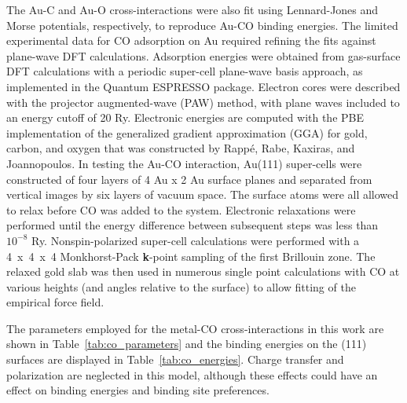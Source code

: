 The Au-C and Au-O cross-interactions were also fit using Lennard-Jones and
Morse potentials, respectively, to reproduce Au-CO binding energies.
The limited experimental data for CO adsorption on Au required refining the fits against plane-wave DFT calculations.
Adsorption energies were obtained from gas-surface DFT calculations with a
periodic super-cell plane-wave basis approach, as implemented in the
Quantum ESPRESSO package.\citep{Giannozzi:2009fe} Electron cores were
described with the projector augmented-wave (PAW)
method,\citep{Blochl:1994vf, Kresse:1999by} with plane waves
included to an energy cutoff of 20 Ry. Electronic energies are
computed with the PBE implementation of the generalized gradient
approximation (GGA) for gold, carbon, and oxygen that was constructed
by Rapp\'e, Rabe, Kaxiras, and Joannopoulos.\citep{Perdew:1996fq, Rappe:1990tw}
In testing the Au-CO interaction, Au(111) super-cells were constructed of four layers of 4
Au x 2 Au surface planes and separated from vertical images by six
layers of vacuum space. The surface atoms were all allowed to relax 
before CO was added to the system. Electronic relaxations were 
performed until the energy difference between subsequent steps 
was less than $10^{-8}$ Ry.   Nonspin-polarized super-cell calculations 
were performed with a 4~x~4~x~4 Monkhorst-Pack {\bf k}-point sampling of the first Brillouin
zone.\citep{Monkhorst:1976il} The relaxed gold slab was
then used in numerous single point calculations with CO at various
heights (and angles relative to the surface) to allow fitting of the
empirical force field.

The parameters employed for the metal-CO cross-interactions in this work 
are shown in Table~\ref{tab:co_parameters} and the binding energies on the 
(111) surfaces are displayed in Table~\ref{tab:co_energies}.  Charge transfer
and polarization are neglected in this model, although these effects could have 
an effect on binding energies and binding site preferences.

